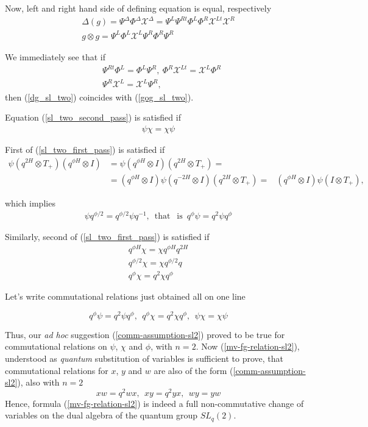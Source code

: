 \documentclass{article}
\newcommand{\lb}{\left (}
\newcommand{\rb}{\right )}
\newcommand{\be}{\begin{eqnarray}}
\newcommand{\ee}{\end{eqnarray}}
\DeclareMathOperator{\that}{that}
\DeclareMathOperator{\is}{is}
\newcommand {\?}{\textit{???}}
\def\dg{\Delta (g)}
\def\gog{g \otimes g}
\def\Chi{\mathcal{X}}
\newcommand{\EChiL}[1][]{\Chi^L_{#1}}
\newcommand{\EChiR}[1][]{\Chi^R_{#1}}
\newcommand{\EChiLT}[1][]{\Chi^{Lt}_{#1}}
\newcommand{\EChiD}[1][]{\Chi^\Delta_{#1}}
\newcommand{\EPsiL}[1][]{\Psi^L_{#1}}
\newcommand{\EPsiR}[1][]{\Psi^R_{#1}}
\newcommand{\EPsiRT}[1][]{\Psi^{Rt}_{#1}}
\newcommand{\EPsiD}[1][]{\Psi^\Delta_{#1}}
\newcommand{\QPhiL}[1][]{\Phi^L_{#1}}
\newcommand{\QPhiR}[1][]{\Phi^R_{#1}}
\newcommand{\QPhiD}[1][]{\Phi^\Delta_{#1}}
\newcommand{\delabel}[1]{(\ref{#1})}
\begin{document}
Now, left and right hand side of defining equation is equal, respectively
\be
& \dg = \EPsiD \QPhiD \EChiD = \EPsiL \EPsiRT \QPhiL \QPhiR \EChiLT \EChiR \label{dg_sl_two} & \\
& \gog = \EPsiL \QPhiL \EChiL \EPsiR \QPhiR \EPsiR \label{gog_sl_two} &
\ee

We immediately see that if
\be
& \EPsiRT \QPhiL = \QPhiL \EPsiR,\ \QPhiR \EChiLT = \EChiL \QPhiR \label{sl_two_first_pass} \\
& \EPsiR \EChiL = \EChiL \EPsiR \label{sl_two_second_pass}
,
\ee
then (\ref{dg_sl_two}) coincides with (\ref{gog_sl_two}).

Equation (\ref{sl_two_second_pass}) is satisfied if
\be
\psi \chi = \chi \psi
\ee

First of (\ref{sl_two_first_pass}) is satisfied if
\be
\psi \lb q^{2H} \otimes T_+ \rb \lb q^{\phi H} \otimes I \rb & = \psi \lb q^{\phi H} \otimes I \rb \lb q^{2H} \otimes T_+ \rb = & \nonumber \\
& = \lb q^{\phi H} \otimes I \rb \psi \lb q^{-2H} \otimes I \rb \lb q^{2H} \otimes T_+ \rb = & \lb q^{\phi H} \otimes I \rb \psi \lb I \otimes T_+ \rb,
\ee

which implies
\be
\psi q^{\phi/2} = q^{\phi/2} \psi q^{-1},\ \that\ \is\ q^\phi \psi = q^2 \psi q^\phi
\ee

Similarly, second of (\ref{sl_two_first_pass}) is satisfied if
\be
q^{\phi H} \chi = \chi q^{\phi H} q^{2H} \\ q^{\phi/2} \chi = \chi q^{\phi/2} q \nonumber \\ q^\phi \chi = q^2 \chi q^\phi \nonumber
\ee

Let's write commutational relations just obtained all on one line

\begin{equation}
\label{comm-relations-psichiphi-sl2}
\boxed{
q^\phi \psi = q^2 \psi q^\phi,\ \ q^\phi \chi = q^2 \chi q^\phi,\ \ \psi \chi = \chi \psi
}
\end{equation}

Thus, our {\it ad hoc} suggestion \delabel{comm-assumption-sl2} proved to be true for commutational
relations on $\psi$, $\chi$ and $\phi$, with $n = 2$.
Now \delabel{mv-fg-relation-sl2}, understood as {\it quantum} substitution of variables is sufficient to
prove, that commutational relations for $x$, $y$ and $w$ are also of the form \delabel{comm-assumption-sl2},
also with $n = 2$
\begin{equation}
\label{comm-relations-wxy-sl2}
\boxed{
x w = q^2 w x,\ \ x y = q^2 y x,\ \ w y = y w
}
\end{equation}
Hence, formula \delabel{mv-fg-relation-sl2} is indeed a full non-commutative change of variables on the
dual algebra of the quantum group $SL_q(2)$.
\end{document}
